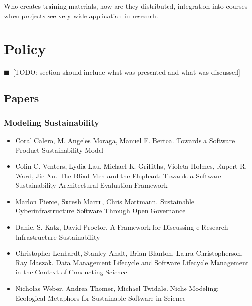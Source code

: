 \documentclass[11pt, oneside]{amsart}
\newcommand{\todo}[1]{{\color{blue}$\blacksquare$~\textsf{[TODO: #1]}}}
\begin{document}
Who creates training materials, how are they distributed, integration into courses when projects see very wide application in research.

\section{Policy}

\todo{section should include what was presented and what was discussed}

\subsection{Papers}

\subsubsection*{Modeling Sustainability}

\begin{itemize}

\item Coral Calero, M. Angeles Moraga, Manuel F. Bertoa. Towards a Software Product Sustainability Model \cite{Calero_WSSSPE}

\item Colin C. Venters, Lydia Lau, Michael K. Griffiths, Violeta Holmes, Rupert R. Ward, Jie Xu. The Blind Men and the Elephant: Towards a Software Sustainability Architectural Evaluation Framework \cite{Venters_WSSSPE}

\item Marlon Pierce, Suresh Marru, Chris Mattmann. Sustainable Cyberinfrastructure Software Through Open Governance \cite{Pierce_WSSSPE}

\item Daniel S. Katz, David Proctor. A Framework for Discussing e-Research Infrastructure Sustainability \cite{Katz_WSSSPE}

\item Christopher Lenhardt, Stanley Ahalt, Brian Blanton, Laura Christopherson, Ray Idaszak. Data Management Lifecycle and Software Lifecycle Management in the Context of Conducting Science \cite{Lenhardt_WSSSPE}

\item Nicholas Weber, Andrea Thomer, Michael Twidale. Niche Modeling: Ecological Metaphors for Sustainable Software in Science \cite{Weber_WSSSPE}

\end{itemize}
\end{document}
